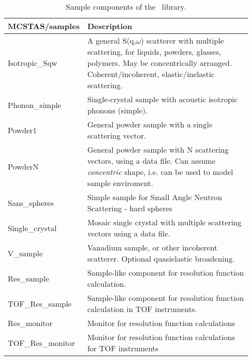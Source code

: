 \begin{table}
  \begin{center}
    {\let\my=\\
    \begin{tabular}{|p{}|p{}|}
      \hline
       {\bf MCSTAS/samples} & Description \\
       \hline
  Isotropic\_Sqw & A general S(q,$\omega$) scatterer with multiple scattering, for liquids, powders, glasses, polymers. May be concentrically arranged. Coherent/incoherent, elastic/inelastic scattering. \\
  Phonon\_simple   & Single-crystal sample with acoustic isotropic phonons (simple). \\
  Powder1      &  General powder sample with a single
                scattering vector. \\
  PowderN      &  General powder sample with N
                scattering vectors, using a data file. Can assume \emph{concentric} shape,
		i.e. can be used to model sample enviroment.\\
  Sans\_spheres  & Simple sample for Small Angle Neutron Scattering - hard spheres \\
  Single\_crystal & Mosaic single crystal with multiple scattering vectors
                    using a data file. \\
  V\_sample      & Vanadium sample, or other incoherent
  scatterer. Optional quasielastic broadening.\\ \hline

    Res\_sample   & Sample-like component for resolution function calculation. \\
  TOF\_Res\_sample   & Sample-like component for resolution function calculation in TOF instruments. \\
Res\_monitor      &   Monitor for resolution function calculations \\
TOF\_Res\_monitor      &   Monitor for resolution function calculations
                        for TOF instruments \\ \hline
    \end{tabular}
    \caption{Sample components of the \MCS\ library.}
    \label{t:comp-samples}
    }
  \end{center}
\end{table}

